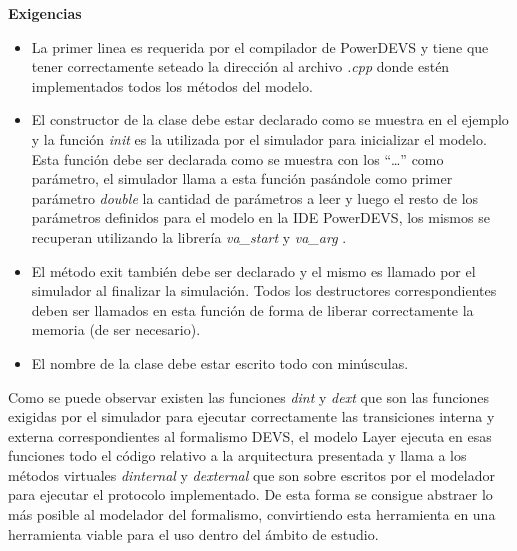 \documentclass[10pt,a4paper]{article}
\begin{document}
\textbf{Exigencias}
\begin{itemize}
\item La primer linea es requerida por el compilador de PowerDEVS y tiene que tener correctamente seteado la dirección al archivo \textit{.cpp} donde estén implementados todos los métodos del modelo.
\item El constructor de la clase debe estar declarado como se muestra en el ejemplo y la función \textit{init} es la utilizada por el simulador para inicializar el modelo. Esta función debe ser declarada como se muestra con los ``\ldots'' como parámetro, el simulador llama a esta función pasándole como primer parámetro \textit{double} la cantidad de parámetros a leer y luego el resto de los parámetros definidos para el modelo en la IDE PowerDEVS, los mismos se recuperan utilizando la librería \textit{va\_start} y \textit{va\_arg} \cite{vastart} \cite{vaarg}.
\item El método exit también debe ser declarado y el mismo es llamado por el simulador al finalizar la simulación. Todos los destructores correspondientes deben ser llamados en esta función de forma de liberar correctamente la memoria (de ser necesario).
\item El nombre de la clase debe estar escrito todo con minúsculas.
\end{itemize}

Como se puede observar existen las funciones \textit{dint} y \textit{dext} que son las funciones exigidas por el simulador para ejecutar correctamente las transiciones interna y externa correspondientes al formalismo DEVS, el modelo Layer ejecuta en esas funciones todo el código relativo a la arquitectura presentada y llama a los métodos virtuales \textit{dinternal} y \textit{dexternal} que son sobre escritos por el modelador para ejecutar el protocolo implementado. De esta forma se consigue abstraer lo más posible al modelador del formalismo, convirtiendo esta herramienta en una herramienta viable para el uso dentro del ámbito de estudio. \\
\end{document}
